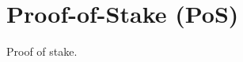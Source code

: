 \section{Proof-of-Stake (PoS)\label{methods}}

\begin{otherlanguage}{english}

Proof of stake.

\end{otherlanguage}